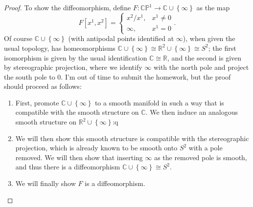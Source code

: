 \documentclass[11pt, letterpaper]{article}
\theoremstyle{plain}
\begin{document}
\begin{proof}
	To show the diffeomorphism, define $F : \mathbb{C} \mathbb{P} ^1 \to \mathbb{C} \cup \left\{ \infty  \right\}$ as the map
	\[
		F[x^1,x^2]=
		\begin{cases}
			x^2/x^1,&x^1\neq 0\\
			\infty ,&x^1=0
		\end{cases}
	.\]
	Of course $\mathbb{C} \cup \left\{ \infty  \right\} $ (with antipodal points identified at $\infty $), when given the usual topology, has homeomorphisms $\mathbb{C} \cup \left\{ \infty  \right\} \cong \mathbb{R} ^2 \cup \left\{ \infty  \right\} \cong S^2$; the first isomorphism is given by the usual identification $\mathbb{C} \cong \mathbb{R} $, and the second is given by stereographic projection, where we identify $\infty $ with the north pole and project the south pole to $0$. I'm out of time to submit the homework, but the proof should proceed as follows:
	\begin{enumerate}
		\item First, promote $\mathbb{C} \cup \left\{ \infty  \right\} $ to a smooth manifold in such a way that is compatible with the smooth structure on $\mathbb{C} $. We then induce an analogous smooth structure on $\mathbb{R}^2 \cup \left\{ \infty  \right\} $:q

		\item We will then show this smooth structure is compatible with the stereographic projection, which is already known to be smooth onto $S^2$ with a pole removed. We will then show that inserting $\infty $ as the removed pole is smooth, and thus there is a diffeomorphism $\mathbb{C} \cup \left\{ \infty  \right\} \cong S^2$.
		\item We will finally show $F$ is a diffeomorphism.
	\end{enumerate}
\end{proof}
\end{document}
